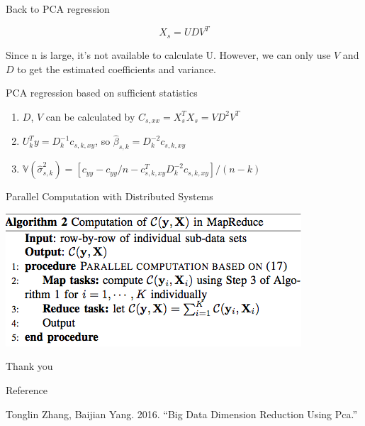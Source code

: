 \documentclass[ignorenonframetext,]{beamer}
\providecommand{\tightlist}{%
  \setlength{\itemsep}{0pt}\setlength{\parskip}{0pt}}
\begin{document}
\subsection{}\label{section}

\begin{frame}{Back to PCA regression}

\[
  X_s = UDV^T
\]

Since n is large, it's not available to calculate U. However, we can
only use \(V\) and \(D\) to get the estimated coefficients and variance.

\begin{block}{PCA regression based on sufficient statistics}

\begin{enumerate}
\def\labelenumi{\arabic{enumi}.}
\tightlist
\item
  \(D\), \(V\) can be calculated by \(C_{s, xx} = X_s^TX_s = VD^2V^T\)
\item
  \(U_k^Ty = D^{-1}_kc_{s,k,xy}\), so
  \(\hat{\beta}_{s,k} = D^{-2}_kc_{s,k,xy}\)
\item
  \(\mathbb{V}(\hat{\sigma}_{s,k}^2) = [c_{yy}-c_{yy}/n - c_{s,k,xy}^TD^{-2}_kc_{s,k,xy}]/(n-k)\)
\end{enumerate}

\end{block}

\end{frame}

\begin{frame}{Parallel Computation with Distributed Systems}

\includegraphics{./Alg_2.png}

\end{frame}

\begin{frame}{}

\begin{center}
\Huge Thank you
\end{center}

\end{frame}

\begin{frame}{Reference}

\hypertarget{refs}{}
\hypertarget{ref-ref5}{}
Tonglin Zhang, Baijian Yang. 2016. ``Big Data Dimension Reduction Using
Pca.''

\end{frame}
\end{document}
